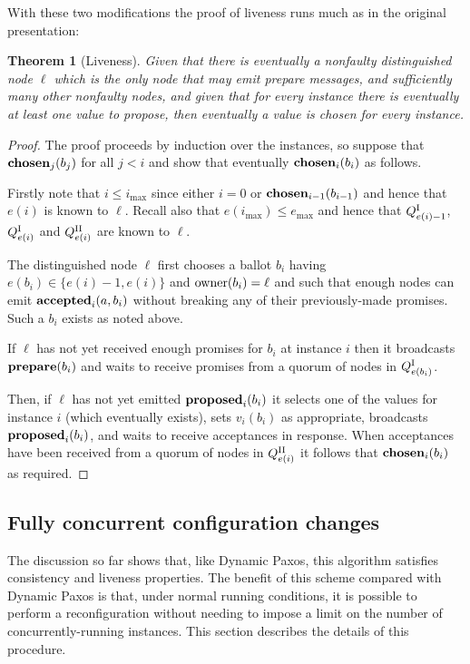 \documentclass[journal]{IEEEtran}
\newtheorem{theorem}{Theorem}
\begin{document}
With these two modifications the proof of liveness runs much as in the original
presentation:

\begin{theorem}[Liveness]\label{liveness-theorem} Given that there is
  eventually a nonfaulty distinguished node $\ell$ which is the only node that
  may emit prepare messages, and sufficiently many other nonfaulty nodes, and
  given that for every instance there is eventually at least one value to
propose, then eventually a value is chosen for every instance.  \end{theorem}

\begin{proof} The proof proceeds by induction over the instances, so suppose
that $\mathbf{chosen}_{j}(b_j)$ for all $j < i$ and show that eventually
$\mathbf{chosen}_{i}(b_i)$ as follows.

Firstly note that $i \le i_{\mathrm{max}}$ since either $i = 0$ or
$\mathbf{chosen}_{i-1}(b_{i-1})$ and hence that $e(i)$ is known to $\ell$. Recall also
that $e(i_{\mathrm{max}}) \le e_{\mathrm{max}}$ and hence that ${Q}^\textrm{I}_{e(i)-1}$,
${Q}^\textrm{I}_{e(i)}$ and ${Q}^\textrm{II}_{e(i)}$ are known to $\ell$.

The distinguished node $\ell$ first chooses a ballot $b_i$ having $e(b_i) \in
\{ e(i) - 1, e(i) \}$ and $\mathrm{owner}(b_i) = \ell$ and such that enough nodes can
emit $\mathbf{accepted}_{i}(a,b_i)$ without breaking any of their previously-made promises.
Such a $b_i$ exists as noted above.

If $\ell$ has not yet received enough promises for $b_i$ at instance $i$ then
it broadcasts $\mathbf{prepare}(b_i)$ and waits to receive promises from a quorum of nodes
in ${Q}^\textrm{I}_{e(b_i)}$.

Then, if $\ell$ has not yet emitted $\mathbf{proposed}_{i}(b_i)$ it selects one of the
values for instance $i$ (which eventually exists), sets $v_i(b_i)$ as
appropriate, broadcasts $\mathbf{proposed}_{i}(b_i)$, and waits to receive acceptances in
response. When acceptances have been received from a quorum of nodes in
${Q}^\textrm{II}_{e(i)}$ it follows that $\mathbf{chosen}_{i}(b_i)$ as required. \end{proof}

\subsection{Fully concurrent configuration changes}\label{fully-concurrent}

The discussion so far shows that, like Dynamic Paxos, this algorithm satisfies
consistency and liveness properties.  The benefit of this scheme compared with
Dynamic Paxos is that, under normal running conditions, it is possible to
perform a reconfiguration without needing to impose a limit on the number of
concurrently-running instances. This section describes the details of this
procedure.
\end{document}
